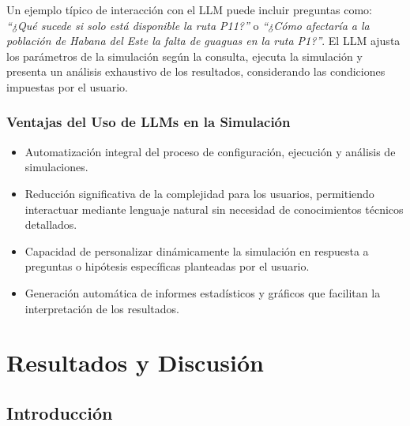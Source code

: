 \documentclass[a4paper,12pt]{article}
\begin{document}
Un ejemplo típico de interacción con el LLM puede incluir preguntas como: \textit{“¿Qué sucede si solo está disponible la ruta P11?”} o \textit{“¿Cómo afectaría a la población de Habana del Este la falta de guaguas en la ruta P1?”}. El LLM ajusta los parámetros de la simulación según la consulta, ejecuta la simulación y presenta un análisis exhaustivo de los resultados, considerando las condiciones impuestas por el usuario.

\subsubsection{Ventajas del Uso de LLMs en la Simulación}
\begin{itemize}
    \item Automatización integral del proceso de configuración, ejecución y análisis de simulaciones.
    \item Reducción significativa de la complejidad para los usuarios, permitiendo interactuar mediante lenguaje natural sin necesidad de conocimientos técnicos detallados.
    \item Capacidad de personalizar dinámicamente la simulación en respuesta a preguntas o hipótesis específicas planteadas por el usuario.
    \item Generación automática de informes estadísticos y gráficos que facilitan la interpretación de los resultados.
\end{itemize}




\section{Resultados y Discusi\'on}

\subsection{Introducción}
\end{document}
